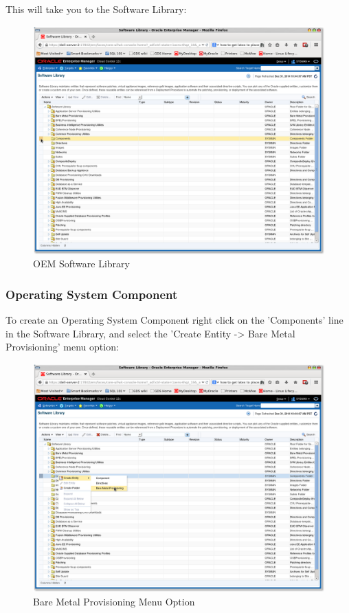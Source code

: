\documentclass[11pt]{article}
\begin{document}
This will take you to the Software Library:
\begin{figure}[htb]
\centering
\includegraphics[width=.9\linewidth]{./images/Software_Library_1.png}
\caption{OEM Software Library}
\end{figure}
\clearpage

\subsubsection{Operating System Component}
\label{sec-4-3-1}
To create an Operating System Component right click on the 'Components' line in the Software Library, and select the 'Create Entity -> Bare Metal Provisioning' menu option:
\begin{figure}[htb]
\centering
\includegraphics[width=.9\linewidth]{./images/Software_Library_BMP_Menu.png}
\caption{Bare Metal Provisioning Menu Option}
\end{figure}
\clearpage
\end{document}
